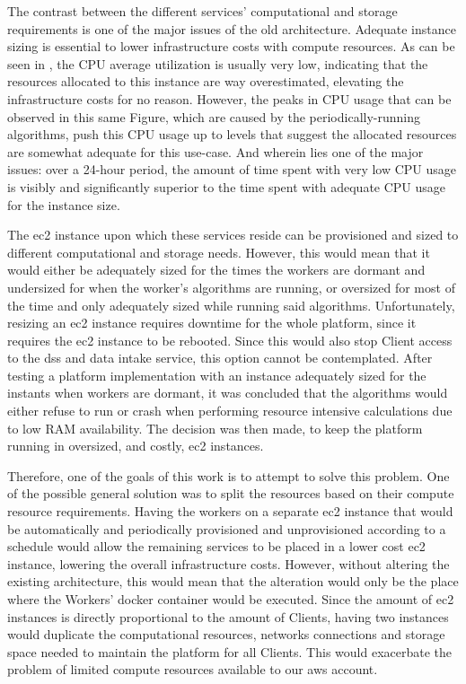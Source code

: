 The contrast between the different services' computational and storage requirements is one of the major issues of the old architecture. Adequate instance sizing is essential to lower infrastructure costs with compute resources. As can be seen in , the CPU average utilization is usually very low, indicating that the resources allocated to this instance are way overestimated, elevating the infrastructure costs for no reason. However, the peaks in CPU usage that can be observed in this same Figure, which are caused by the periodically-running algorithms, push this CPU usage up to levels that suggest the allocated resources are somewhat adequate for this use-case. And wherein lies one of the major issues: over a 24-hour period, the amount of time spent with very low CPU usage is visibly and significantly superior to the time spent with adequate CPU usage for the instance size. 



The \gls{ec2} instance upon which these services reside can be provisioned and sized to different computational and storage needs. However, this would mean that it would either be adequately sized for the times the workers are dormant and undersized for when the worker's algorithms are running, or oversized for most of the time and only adequately sized while running said algorithms. Unfortunately, resizing an \gls{ec2} instance requires downtime for the whole platform, since it requires the \gls{ec2} instance to be rebooted. Since this would also stop Client access to the \gls{dss} and data intake service, this option cannot be contemplated. After testing a platform implementation with an instance adequately sized for the instants when workers are dormant, it was concluded that the algorithms would either refuse to run or crash when performing resource intensive calculations due to low RAM availability. The decision was then made, to keep the platform running in oversized, and costly, \gls{ec2} instances.

Therefore, one of the goals of this work is to attempt to solve this problem. One of the possible general solution was to split the resources based on their compute resource requirements. Having the workers on a separate \gls{ec2} instance that would be automatically and periodically provisioned and unprovisioned according to a schedule would allow the remaining services to be placed in a lower cost \gls{ec2} instance, lowering the overall infrastructure costs. However, without altering the existing architecture, this would mean that the alteration would only be the place where the Workers' docker container would be executed. Since the amount of \gls{ec2} instances is directly proportional to the amount of Clients, having two instances would duplicate the computational resources, networks connections and storage space needed to maintain the platform for all Clients. This would exacerbate the problem of limited compute resources available to our \gls{aws} account.

